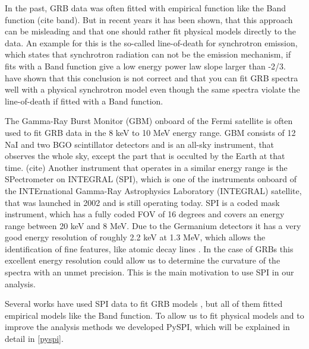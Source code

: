 \documentclass[twocolumn]{aa}
\begin{document}
In the past, GRB data was often fitted with empirical function like the Band function (cite band). But in recent years it has been shown, that this approach can be misleading and that one should rather fit physical models directly to the data. An example for this is the so-called line-of-death for synchrotron emission, which states that synchrotron radiation can not be the emission mechanism, if fits with a Band function give a low energy power law slope larger than -2/3. \citep{line-of-death, line-of-death2}
\citet{synch} have shown that this conclusion is not correct and that you can fit GRB spectra well with a physical synchrotron model even though the same spectra violate the line-of-death if fitted with a Band function.

The Gamma-Ray Burst Monitor (GBM) onboard of the Fermi satellite is often used to fit GRB data in the 8 keV to 10 MeV energy range. GBM consists of 12 NaI and two BGO scintillator detectors and is an all-sky instrument, that observes the whole sky, except the part that is occulted by the Earth at that time. (cite)
Another instrument that operates in a similar energy range is the SPectrometer on INTEGRAL (SPI), which is one of the instruments onboard of the INTErnational Gamma-Ray Astrophysics Laboratory (INTEGRAL) satellite, that was launched in 2002 and is still operating today. SPI is a coded mask instrument, which has a fully coded FOV of 16 degrees and covers an energy range between 20 keV and 8 MeV. Due to the Germanium detectors it has a very good energy resolution of roughly 2.2 keV at 1.3 MeV, which allows the identification of fine features, like atomic decay lines \citep{spi}. In the case of GRBs this excellent energy resolution could allow us to determine the curvature of the spectra with an unmet precision. This is the main motivation to use SPI in our analysis.

Several works have used SPI data to fit GRB models \citep{spi_grb1, spi_grb2}, but all of them fitted empirical models like the Band function. To allow us to fit physical models and to improve the analysis methods we developed PySPI, which will be explained in detail in \ref{pyspi}.

\end{document}
